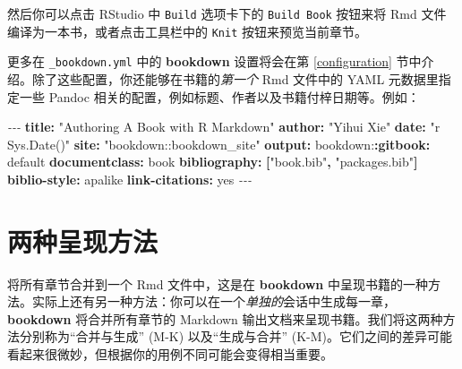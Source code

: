 \documentclass[
  12pt,
]{krantz}
\newenvironment{Shaded}{\begin{snugshade}}{\end{snugshade}}
\newcommand{\AttributeTok}[1]{\textcolor[rgb]{0.13,0.29,0.53}{#1}}
\newcommand{\CharTok}[1]{\textcolor[rgb]{0.31,0.60,0.02}{#1}}
\newcommand{\FunctionTok}[1]{\textcolor[rgb]{0.13,0.29,0.53}{\textbf{#1}}}
\newcommand{\KeywordTok}[1]{\textcolor[rgb]{0.13,0.29,0.53}{\textbf{#1}}}
\newcommand{\PreprocessorTok}[1]{\textcolor[rgb]{0.56,0.35,0.01}{\textit{#1}}}
\newcommand{\StringTok}[1]{\textcolor[rgb]{0.31,0.60,0.02}{#1}}
\theoremstyle{definition}
\theoremstyle{definition}
\theoremstyle{definition}
\theoremstyle{definition}
\theoremstyle{remark}
\begin{document}
然后你可以点击 RStudio 中 \texttt{Build} 选项卡下的 \texttt{Build\ Book} 按钮来将 Rmd 文件编译为一本书，或者点击工具栏中的 \texttt{Knit} 按钮来预览当前章节。

更多在 \texttt{\_bookdown.yml} 中的 \textbf{bookdown} 设置将会在第 \ref{configuration} 节中介绍。除了这些配置，你还能够在书籍的\emph{第一个} Rmd 文件中的 YAML 元数据里指定一些 Pandoc 相关的配置，例如标题、作者以及书籍付梓日期等。例如：

\begin{Shaded}
\begin{Highlighting}[]
\PreprocessorTok{{-}{-}{-} }
\FunctionTok{title}\KeywordTok{:}\AttributeTok{ }\StringTok{"Authoring A Book with R Markdown"}
\FunctionTok{author}\KeywordTok{:}\AttributeTok{ }\StringTok{"Yihui Xie"}
\FunctionTok{date}\KeywordTok{:}\AttributeTok{ }\StringTok{"\textasciigrave{}r Sys.Date()\textasciigrave{}"}
\FunctionTok{site}\KeywordTok{:}\AttributeTok{ }\StringTok{"bookdown::bookdown\_site"}
\FunctionTok{output}\KeywordTok{:}
\AttributeTok{  bookdown:}\FunctionTok{:gitbook}\KeywordTok{:}\AttributeTok{ default}
\FunctionTok{documentclass}\KeywordTok{:}\AttributeTok{ book}
\FunctionTok{bibliography}\KeywordTok{:}\AttributeTok{ }\KeywordTok{[}\StringTok{"book.bib"}\KeywordTok{,}\AttributeTok{ }\StringTok{"packages.bib"}\KeywordTok{]}
\FunctionTok{biblio{-}style}\KeywordTok{:}\AttributeTok{ apalike}
\FunctionTok{link{-}citations}\KeywordTok{:}\AttributeTok{ }\CharTok{yes}
\PreprocessorTok{{-}{-}{-}}
\end{Highlighting}
\end{Shaded}

\section{两种呈现方法}\label{new-session}

将所有章节合并到一个 Rmd 文件中，这是在 \textbf{bookdown} 中呈现书籍的一种方法。实际上还有另一种方法：你可以在一个\emph{单独的}会话中生成每一章，\textbf{bookdown} 将合并所有章节的 Markdown 输出文档来呈现书籍。我们将这两种方法分别称为``合并与生成'' (M-K) 以及``生成与合并'' (K-M)。它们之间的差异可能看起来很微妙，但根据你的用例不同可能会变得相当重要。
\end{document}
